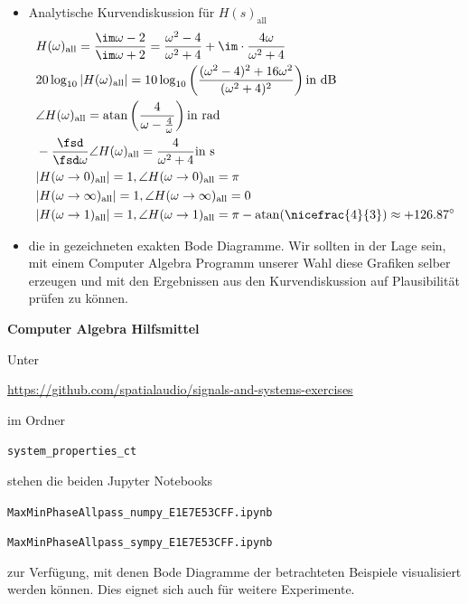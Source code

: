 \begin{itemize}
\item Analytische Kurvendiskussion für $H(s)_\mathrm{all}$
\begin{align}
&H(\omega)_\mathrm{all} = \frac{\im\omega-2}{\im\omega+2}=
\frac{\omega^2-4}{\omega^2+4}+
\im\cdot\frac{4\omega}{\omega^2+4}\\
&20 \log_{10}|H(\omega)_\mathrm{all}| =
10 \log_{10} \left(\frac{(\omega^2-4)^2+16\omega^2}{(\omega^2+4)^2}\right)\text{in dB}\\
&\angle H(\omega)_\mathrm{all} =
\mathrm{atan}\left(\frac{4}{\omega-\frac{4}{\omega}}\right)\text{in rad}\\
&-\frac{\fsd}{\fsd \omega} \angle H(\omega)_\mathrm{all}=
\frac{4}{\omega^2+4}\text{in s}\\
&|H(\omega\to 0)_\mathrm{all}| = 1, \angle H(\omega\to 0)_\mathrm{all} = \pi\\
&|H(\omega\to\infty)_\mathrm{all}| = 1, \angle H(\omega\to\infty)_\mathrm{all} = 0\\
&|H(\omega\to 1)_\mathrm{all}| = 1, \angle H(\omega\to 1)_\mathrm{all} = \pi - \mathrm{atan}(\nicefrac{4}{3}) \approx +126.87^\circ
\end{align}

\item die in  gezeichneten exakten
Bode Diagramme. Wir sollten in der Lage sein, mit einem Computer Algebra Programm
unserer Wahl diese Grafiken selber erzeugen und mit den Ergebnissen
aus den Kurvendiskussion auf Plausibilität prüfen zu können.

\end{itemize}

\noindent \textbf{Computer Algebra Hilfsmittel}

\noindent Unter

\url{https://github.com/spatialaudio/signals-and-systems-exercises}

\noindent im Ordner

\texttt{system\_properties\_ct}

\noindent stehen die beiden Jupyter Notebooks

\texttt{MaxMinPhaseAllpass\_numpy\_E1E7E53CFF.ipynb}

\texttt{MaxMinPhaseAllpass\_sympy\_E1E7E53CFF.ipynb}

\noindent zur Verfügung, mit denen Bode Diagramme der betrachteten Beispiele visualisiert
werden können. Dies eignet sich auch für weitere Experimente.

